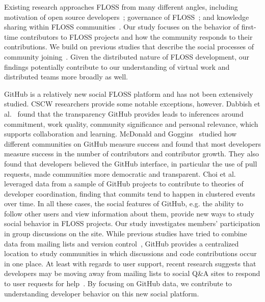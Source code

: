 \documentclass{sigchi}
\begin{document}
Existing research approaches FLOSS from many different angles, including
motivation of open source
developers~\cite{fang_understanding_2009, lakhani_why_2003, shah_motivation_2006}; governance of FLOSS~\cite{hippel_open_2003, omahony_guarding_2003, 
omahony_governance_2007};
and knowledge sharing within FLOSS
communities~\cite{endres_tacit_2007, hemetsberger_collective_2009, sowe_understanding_2008}.
Our study focuses on the behavior of first-time contributors to FLOSS projects
and how the community responds to their contributions. We build on previous studies that
describe the social processes of community
joining~\cite{ducheneaut_socialization_2005, huang_mining_2005, von_krogh_community_2003}. Given the
distributed nature of FLOSS development, our findings potentially contribute to our understanding of virtual work and distributed teams more broadly as well.

GitHub is a relatively new social FLOSS platform and has not been extensively studied. CSCW researchers provide some notable exceptions, however.
Dabbish et al.~\cite{dabbish_social_2012} found that the transparency GitHub provides leads to
inferences around commitment, work quality, community significance and personal
relevance, which supports collaboration and learning. McDonald and
Goggins~\cite{mcdonald_performance_2013} studied how different communities on
GitHub measure success and found that most developers measure success in the
number of contributors and contributor growth. They also found that developers
believed the GitHub interface, in particular the use of pull requests, made
communities more democratic and transparent. Choi et
al.~\cite{choi_herding_2013} leveraged data from a sample of GitHub projects to
contribute to theories of developer coordination, finding that commits tend to
happen in clustered events over time. In all these cases, the social features of
GitHub, e.g. the ability to follow other users and view information about them,
provide new ways to study social behavior in FLOSS projects. Our study
investigates members' participation in group discussions on the site. While
previous studies have tried to combine data from mailing lists and version
control~\cite{ducheneaut_socialization_2005}, GitHub provides a centralized
location to study communities in which discussions and code contributions
occur in one place. At least with regards to user support, recent research
suggests that developers may be moving away from mailing lists to social Q\&A
sites to respond to user requests for help~\cite{vasilescu_how_2014}. By
focusing on GitHub data, we contribute to understanding developer behavior on
this new social platform.
\end{document}
